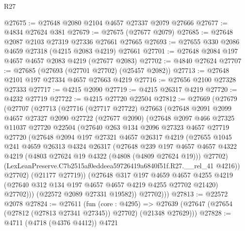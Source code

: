 \begin{lexlean}{R27}
\begin{coremodule}
@27675 := @27648 @2080 @2104 @4657 @27337 @2079 @27666
@27677 := @4834 @27624 @381
@27679 := @27675 (@27677 @2079)
@27685 := @27648 @2087 @2103 @27319 @27336 @27661 @27665
@27693 := @27655 @330 @2086 @4659 @27318 (@4215 @2083 @4219) @27661
@27701 := @27648 @2084 @197 @4657 @4657 @2083 @4219 (@27677 @2083)
@27702 := @4840 @27624
@27707 := @27685 (@27693 (@27701 @27702) (@25457 @2082))
@27713 := @27648 @2101 @197 @27334 @4657 @27663 @4219
@27716 := @27656 @2100 @27328 @27333
@27717 := @4215 @2090
@27719 := @4215 @26317 @4219
@27720 := @4232 @27719
@27722 := @4215 @27720 @22504
@27812 := @27669
    (@27679
      (@27707
        (@27713
          (@27716
            (@27717 @27722)
            @27663
            (@27648
              @2091
              @2099
              @4657
              @27327
              @2090
              @27722
              (@27677 @2090)
              (@27648
                @2097
                @466
                @27325
                @11037
                @27720
                @22504
                (@27640
                  @263
                  @134
                  @2096
                  @27323
                  @4657
                  @27719
                  @27720
                  (@27648
                    @2094
                    @197
                    @27321
                    @4657
                    @26317
                    @4219
                    (@27655
                      @1045
                      @241
                      @4659
                      @26313
                      @4324
                      @26317
                      (@27648
                        @239
                        @197
                        @4657
                        @4657
                        @4322
                        @4219
                        (@4803 @27624 @19 @4322 (@4808 (@4809 @27624 @19)))
                        @27702)
                      (LexLeanPreserve.C7b2515af0eddeea59726419a6840f51f.R27.__rel_41 @4216))
                    @27702)
                  (@21177 @27719))
                (@27648
                  @317
                  @197
                  @4659
                  @4657
                  @4255
                  @4219
                  (@27640 @312 @134 @197 @4657 @4657 @4219 @4255 @27702 @21420)
                  @27702)))
            (@22572 @2089 @27331 @19582))
          @27702)))
@27813 := @22572 @2078
@27824 := @27611
    (fun (core : @4295) =>
    @27639 (@27647 (@27654 (@27812 (@27813 @27341 @27345)) @27702) (@21348 @27629)))
@27828 := @4711 (@4718 (@4376 @4412)) @4721

\end{coremodule}
\end{lexlean}

